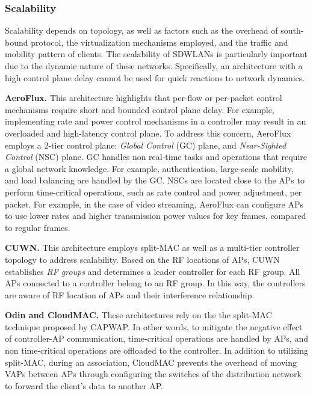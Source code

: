 \subsubsection{\textbf{Scalability}}
\label{arch_scalability}
Scalability depends on topology, as well as factors such as the overhead of south-bound protocol, the virtualization mechanisms employed, and the traffic and mobility pattern of clients.
The scalability of SDWLANs is particularly important due to the dynamic nature of these networks.
Specifically, an architecture with a high control plane delay cannot be used for quick reactions to network dynamics.


\textbf{AeroFlux.}
This architecture \cite{AeroFlux,AeroFlux2} highlights that per-flow or per-packet control mechanisms require short and bounded control plane delay.
For example, implementing rate and power control mechanisms in a controller may result in an overloaded and high-latency control plane.
To address this concern, AeroFlux employs a 2-tier control plane: \textit{Global Control }(GC) plane, and \textit{Near-Sighted Control} (NSC) plane. 
GC handles non real-time tasks and operations that require a global network knowledge.
For example, authentication, large-scale mobility, and load balancing are handled by the GC.
NSCs are located close to the APs to perform time-critical operations, such as rate control and power adjustment, per packet.
For example, in the case of video streaming, AeroFlux can configure APs to use lower rates and higher transmission power values for key frames, compared to regular frames.

\textbf{CUWN.} This architecture \cite{Cisco} employs split-MAC as well as a multi-tier controller topology to address scalability.
Based on the RF locations of APs, CUWN establishes \textit{RF groups} and determines a leader controller for each RF group. %
All APs connected to a controller belong to an RF group. 
In this way, the controllers are aware of RF location of APs and their interference relationship.

\textbf{Odin and CloudMAC.}
These architectures \cite{Odin,CloudMAC3} rely on the the split-MAC technique proposed by CAPWAP.
In other words, to mitigate the negative effect of controller-AP communication, time-critical operations are handled by APs, and non time-critical operations are offloaded to the controller.
In addition to utilizing split-MAC, during an association, CloudMAC prevents the overhead of moving VAPs between APs through configuring the switches of the distribution network to forward the client's data to another AP.



